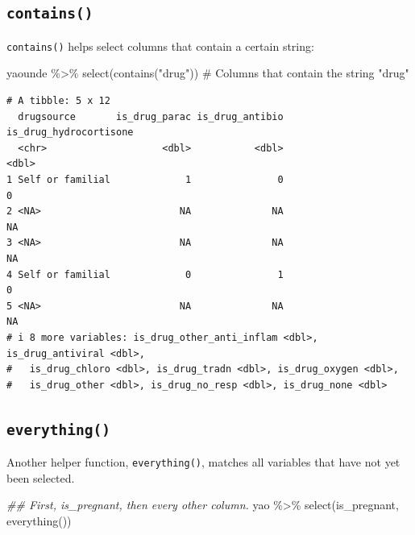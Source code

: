 \documentclass[
  letterpaper,
  DIV=11,
  numbers=noendperiod]{scrreprt}
\newenvironment{Shaded}{\begin{snugshade}}{\end{snugshade}}
\newcommand{\CommentTok}[1]{\textcolor[rgb]{0.37,0.37,0.37}{#1}}
\newcommand{\DocumentationTok}[1]{\textcolor[rgb]{0.37,0.37,0.37}{\textit{#1}}}
\newcommand{\FunctionTok}[1]{\textcolor[rgb]{0.28,0.35,0.67}{#1}}
\newcommand{\NormalTok}[1]{\textcolor[rgb]{0.00,0.23,0.31}{#1}}
\newcommand{\SpecialCharTok}[1]{\textcolor[rgb]{0.37,0.37,0.37}{#1}}
\newcommand{\StringTok}[1]{\textcolor[rgb]{0.13,0.47,0.30}{#1}}
\begin{document}
\subsection{\texorpdfstring{\texttt{contains()}}{contains()}}\label{contains}

\texttt{contains()} helps select columns that contain a certain string:

\begin{Shaded}
\begin{Highlighting}[]
\NormalTok{yaounde }\SpecialCharTok{\%\textgreater{}\%} \FunctionTok{select}\NormalTok{(}\FunctionTok{contains}\NormalTok{(}\StringTok{"drug"}\NormalTok{)) }\CommentTok{\# Columns that contain the string "drug"}
\end{Highlighting}
\end{Shaded}

\begin{verbatim}
# A tibble: 5 x 12
  drugsource       is_drug_parac is_drug_antibio is_drug_hydrocortisone
  <chr>                    <dbl>           <dbl>                  <dbl>
1 Self or familial             1               0                      0
2 <NA>                        NA              NA                     NA
3 <NA>                        NA              NA                     NA
4 Self or familial             0               1                      0
5 <NA>                        NA              NA                     NA
# i 8 more variables: is_drug_other_anti_inflam <dbl>, is_drug_antiviral <dbl>,
#   is_drug_chloro <dbl>, is_drug_tradn <dbl>, is_drug_oxygen <dbl>,
#   is_drug_other <dbl>, is_drug_no_resp <dbl>, is_drug_none <dbl>
\end{verbatim}

\subsection{\texorpdfstring{\texttt{everything()}}{everything()}}\label{everything}

Another helper function, \texttt{everything()}, matches all variables
that have not yet been selected.

\begin{Shaded}
\begin{Highlighting}[]
\DocumentationTok{\#\# First, \textasciigrave{}is\_pregnant\textasciigrave{}, then every other column.}
\NormalTok{yao }\SpecialCharTok{\%\textgreater{}\%} \FunctionTok{select}\NormalTok{(is\_pregnant, }\FunctionTok{everything}\NormalTok{())}
\end{Highlighting}
\end{Shaded}
\end{document}
